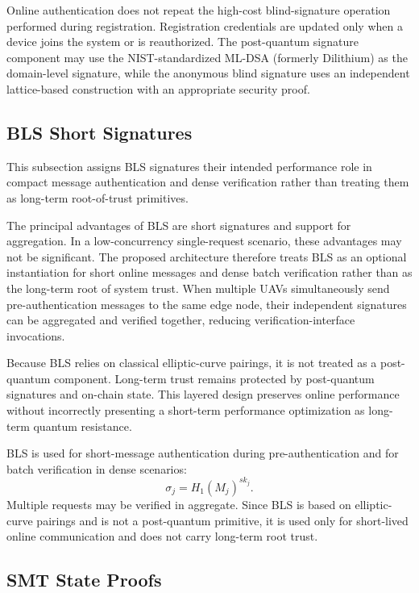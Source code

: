\documentclass[lettersize,journal]{IEEEtran}
\begin{document}
	Online authentication does not repeat the high-cost blind-signature operation performed during registration. Registration credentials are updated only when a device joins the system or is reauthorized. The post-quantum signature component may use the NIST-standardized ML-DSA (formerly Dilithium) as the domain-level signature, while the anonymous blind signature uses an independent lattice-based construction with an appropriate security proof.
	
	\subsection{BLS Short Signatures}
	This subsection assigns BLS signatures their intended performance role in compact message authentication and dense verification rather than treating them as long-term root-of-trust primitives.
	
	
	The principal advantages of BLS are short signatures and support for aggregation. In a low-concurrency single-request scenario, these advantages may not be significant. The proposed architecture therefore treats BLS as an optional instantiation for short online messages and dense batch verification rather than as the long-term root of system trust. When multiple UAVs simultaneously send pre-authentication messages to the same edge node, their independent signatures can be aggregated and verified together, reducing verification-interface invocations.
	
	Because BLS relies on classical elliptic-curve pairings, it is not treated as a post-quantum component. Long-term trust remains protected by post-quantum signatures and on-chain state. This layered design preserves online performance without incorrectly presenting a short-term performance optimization as long-term quantum resistance.
	
	BLS is used for short-message authentication during pre-authentication and for batch verification in dense scenarios:
	\begin{equation}
		\sigma_j=H_1(M_j)^{sk_j}.
	\end{equation}
	Multiple requests may be verified in aggregate. Since BLS is based on elliptic-curve pairings and is not a post-quantum primitive, it is used only for short-lived online communication and does not carry long-term root trust.
	
	\subsection{SMT State Proofs}
	
\end{document}
